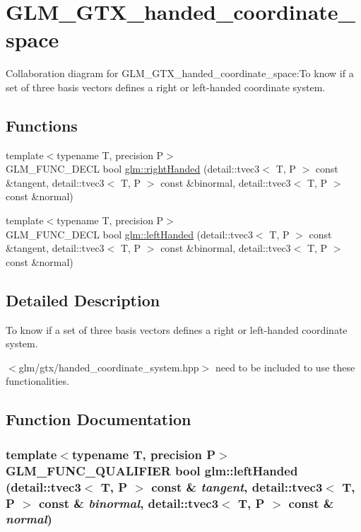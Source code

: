 \hypertarget{group__gtx__handed__coordinate__space}{
\section{GLM\_\-GTX\_\-handed\_\-coordinate\_\-space}
\label{group__gtx__handed__coordinate__space}
}


Collaboration diagram for GLM\_\-GTX\_\-handed\_\-coordinate\_\-space:To know if a set of three basis vectors defines a right or left-handed coordinate system.  
\subsection*{Functions}
\begin{CompactItemize}
\item 
{\footnotesize template$<$typename T, precision P$>$ }\\GLM\_\-FUNC\_\-DECL bool \hyperlink{group__gtx__handed__coordinate__space_g65f766ab3c8924b90eabc0e1ecf014d1}{glm::rightHanded} (detail::tvec3$<$ T, P $>$ const \&tangent, detail::tvec3$<$ T, P $>$ const \&binormal, detail::tvec3$<$ T, P $>$ const \&normal)
\item 
{\footnotesize template$<$typename T, precision P$>$ }\\GLM\_\-FUNC\_\-DECL bool \hyperlink{group__gtx__handed__coordinate__space_g5613515e0fdb693d30e9e8db0aa17176}{glm::leftHanded} (detail::tvec3$<$ T, P $>$ const \&tangent, detail::tvec3$<$ T, P $>$ const \&binormal, detail::tvec3$<$ T, P $>$ const \&normal)
\end{CompactItemize}


\subsection{Detailed Description}
To know if a set of three basis vectors defines a right or left-handed coordinate system. 

$<$glm/gtx/handed\_\-coordinate\_\-system.hpp$>$ need to be included to use these functionalities. 

\subsection{Function Documentation}
\hypertarget{group__gtx__handed__coordinate__space_g5613515e0fdb693d30e9e8db0aa17176}{
\subsubsection[leftHanded]{\setlength{\rightskip}{0pt plus 5cm}template$<$typename T, precision P$>$ GLM\_\-FUNC\_\-QUALIFIER bool glm::leftHanded (detail::tvec3$<$ T, P $>$ const \& {\em tangent}, \/  detail::tvec3$<$ T, P $>$ const \& {\em binormal}, \/  detail::tvec3$<$ T, P $>$ const \& {\em normal})}}
\label{group__gtx__handed__coordinate__space_g5613515e0fdb693d30e9e8db0aa17176}


